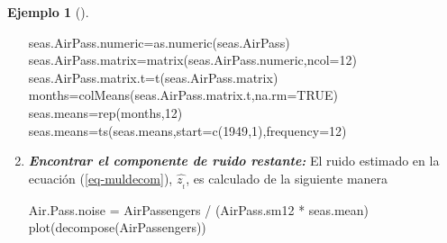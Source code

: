 \documentclass[
  us-letterpaper,
]{scrreprt}
\newenvironment{Shaded}{\begin{snugshade}}{\end{snugshade}}
\newcommand{\AttributeTok}[1]{\textcolor[rgb]{0.40,0.45,0.13}{#1}}
\newcommand{\ConstantTok}[1]{\textcolor[rgb]{0.56,0.35,0.01}{#1}}
\newcommand{\DecValTok}[1]{\textcolor[rgb]{0.68,0.00,0.00}{#1}}
\newcommand{\FunctionTok}[1]{\textcolor[rgb]{0.28,0.35,0.67}{#1}}
\newcommand{\NormalTok}[1]{\textcolor[rgb]{0.00,0.23,0.31}{#1}}
\newcommand{\OtherTok}[1]{\textcolor[rgb]{0.00,0.23,0.31}{#1}}
\newcommand{\SpecialCharTok}[1]{\textcolor[rgb]{0.37,0.37,0.37}{#1}}
\theoremstyle{plain}
\theoremstyle{definition}
\theoremstyle{definition}
\newtheorem{example}{Ejemplo}[chapter]
\theoremstyle{plain}
\theoremstyle{remark}
\begin{document}
\begin{example}[]
\begin{tcolorbox}
\begin{enumerate}
\begin{Shaded}
\begin{Highlighting}[]
\NormalTok{seas.AirPass.numeric}\OtherTok{=}\FunctionTok{as.numeric}\NormalTok{(seas.AirPass) }
\NormalTok{seas.AirPass.matrix}\OtherTok{=}\FunctionTok{matrix}\NormalTok{(seas.AirPass.numeric,}\AttributeTok{ncol=}\DecValTok{12}\NormalTok{) }
\NormalTok{seas.AirPass.matrix.t}\OtherTok{=}\FunctionTok{t}\NormalTok{(seas.AirPass.matrix) }
\NormalTok{months}\OtherTok{=}\FunctionTok{colMeans}\NormalTok{(seas.AirPass.matrix.t,}\AttributeTok{na.rm=}\ConstantTok{TRUE}\NormalTok{) }
\NormalTok{seas.means}\OtherTok{=}\FunctionTok{rep}\NormalTok{(months,}\DecValTok{12}\NormalTok{) }
\NormalTok{seas.means}\OtherTok{=}\FunctionTok{ts}\NormalTok{(seas.means,}\AttributeTok{start=}\FunctionTok{c}\NormalTok{(}\DecValTok{1949}\NormalTok{,}\DecValTok{1}\NormalTok{),}\AttributeTok{frequency=}\DecValTok{12}\NormalTok{)}
\end{Highlighting}
\end{Shaded}
\item
  \textbf{\emph{Encontrar el componente de ruido restante:}} El ruido
  estimado en la ecuación (\ref{eq-muldecom}), \(\hat{z_{_t}}\), es
  calculado de la siguiente manera

\begin{Shaded}
\begin{Highlighting}[]
\NormalTok{Air.Pass.noise }\OtherTok{=}\NormalTok{ AirPassengers }\SpecialCharTok{/}\NormalTok{ (AirPass.sm12 }\SpecialCharTok{*}\NormalTok{ seas.mean)}
\FunctionTok{plot}\NormalTok{(}\FunctionTok{decompose}\NormalTok{(AirPassengers))}
\end{Highlighting}
\end{Shaded}

  \begin{figure}[H]

\end{figure}
\end{enumerate}
\end{tcolorbox}
\end{example}
\end{document}

